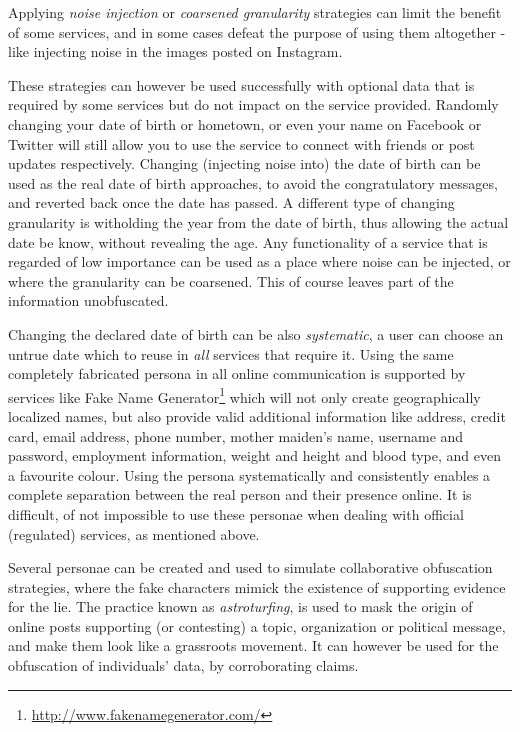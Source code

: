 \documentclass{IOS-Book-Article}     %
\begin{document}
Applying \emph{noise injection} or \emph{coarsened granularity} strategies can 
limit the benefit of some services, and in some cases defeat the purpose of 
using them altogether - like injecting noise in the images posted on Instagram.

These strategies can however be used successfully with optional data that 
is required by some services but do not impact on the service provided. 
Randomly changing your date of birth or hometown, or even your name on Facebook 
or Twitter will still allow you to use the service to connect with friends or 
post updates respectively. Changing (injecting noise into) the date of birth 
can be used as the real date of birth approaches, to avoid the 
congratulatory messages, and reverted back once the date has passed. A 
different type of changing granularity is witholding the year from the 
date of birth, thus allowing the actual date be know, without revealing the 
age. Any functionality of a service that is regarded of low importance can be 
used as a place where noise can be injected, or where the granularity can be 
coarsened. This of course leaves part of the information unobfuscated. 

Changing the declared date of birth can be also \emph{systematic}, a user can 
choose an untrue date which to reuse in \emph{all} services that require it. 
Using the same completely fabricated persona in all online communication is 
supported by services like Fake Name 
Generator\footnote{\url{http://www.fakenamegenerator.com/}} which will not only 
create geographically localized names, but also provide valid additional 
information like address, credit card, email address, phone number, mother 
maiden's name, username and password, employment information, weight and height 
and blood type, and even a favourite colour. Using the persona systematically 
and consistently enables a complete separation between the real person and their 
presence online. It is difficult, of not impossible to use these personae when 
dealing with official (regulated) services, as mentioned above.

Several personae can be created and used to simulate collaborative obfuscation 
strategies, where the fake characters mimick the existence of supporting 
evidence for the lie. The practice known as \emph{astroturfing}, is used to mask the origin of online 
posts supporting (or contesting) a topic, organization or political message, 
and make them look like a grassroots movement. It can however be used for the obfuscation of individuals' data, by corroborating claims.
\end{document}
